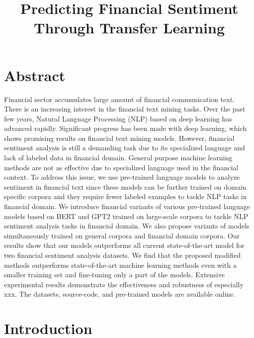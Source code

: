 \documentclass[11pt]{article}
\title{\vspace{-4cm} Predicting Financial Sentiment Through Transfer Learning}
\author{}
\date{}
\begin{document}
\maketitle


\section{Abstract}

Financial sector accumulates large amount of financial communication
text. There is an increasing interest in the financial text mining tasks. Over the past few years, Natural Language Processing (NLP) based on deep learning
has advanced rapidly. Significant progress has been made with deep
learning, which shows promising results on financial text mining
models. However, financial sentiment analysis is still a demanding task due to its specialized
language and lack of labeled data in financial domain. General purpose
machine learning methods are not as effective due to specialized
language used in the financial context. To address this issue, we use pre-trained language models to analyze sentiment
in financial text since these models can be further trained on domain specific
corpora and they require fewer labeled examples to tackle NLP tasks in financial domain.
We introduce financial variants of various pre-trained language models
based on BERT and GPT2 trained on large-scale corpora to tackle NLP sentiment analysis tasks in
financial domain. We also propose variants of models simultaneously
trained on general corpora and financial domain corpora. Our results show that our models outperforms all current
state-of-the-art model for two financial sentiment analysis datasets. We find that the proposed modified methods outperforms state-of-the-art machine learning
methods even with a smaller training set and fine-tuning only a part of
the models. Extensive experimental results demonstrate the effectiveness
and robustness of especially xxx. The datasets, source-code, and
pre-trained models are available online.

\section{Introduction}
\end{document}
